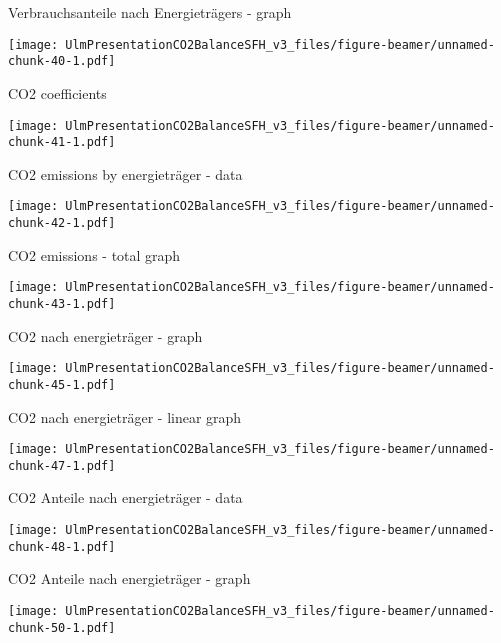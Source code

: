 \documentclass[ignorenonframetext,]{beamer}
\begin{document}
\begin{frame}{Verbrauchsanteile nach Energieträgers - graph}

\texttt{[image: UlmPresentationCO2BalanceSFH\_v3\_files/figure-beamer/unnamed-chunk-40-1.pdf]}

\end{frame}

\begin{frame}{CO2 coefficients}

\texttt{[image: UlmPresentationCO2BalanceSFH\_v3\_files/figure-beamer/unnamed-chunk-41-1.pdf]}

\end{frame}

\begin{frame}{CO2 emissions by energieträger - data}

\texttt{[image: UlmPresentationCO2BalanceSFH\_v3\_files/figure-beamer/unnamed-chunk-42-1.pdf]}

\end{frame}

\begin{frame}{CO2 emissions - total graph}

\texttt{[image: UlmPresentationCO2BalanceSFH\_v3\_files/figure-beamer/unnamed-chunk-43-1.pdf]}

\end{frame}

\begin{frame}{CO2 nach energieträger - graph}

\texttt{[image: UlmPresentationCO2BalanceSFH\_v3\_files/figure-beamer/unnamed-chunk-45-1.pdf]}

\end{frame}

\begin{frame}{CO2 nach energieträger - linear graph}

\texttt{[image: UlmPresentationCO2BalanceSFH\_v3\_files/figure-beamer/unnamed-chunk-47-1.pdf]}

\end{frame}

\begin{frame}{CO2 Anteile nach energieträger - data}

\texttt{[image: UlmPresentationCO2BalanceSFH\_v3\_files/figure-beamer/unnamed-chunk-48-1.pdf]}

\end{frame}

\begin{frame}{CO2 Anteile nach energieträger - graph}

\texttt{[image: UlmPresentationCO2BalanceSFH\_v3\_files/figure-beamer/unnamed-chunk-50-1.pdf]}

\end{frame}
\end{document}
